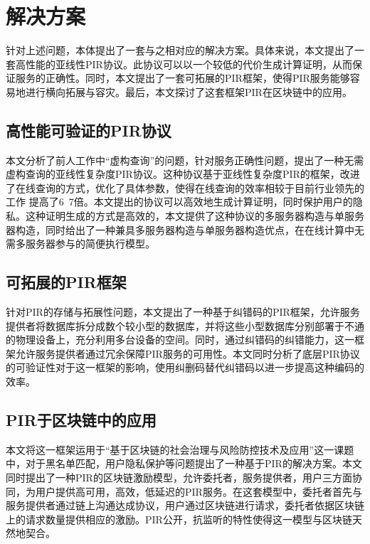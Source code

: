 \section{解决方案}
针对上述问题，本体提出了一套与之相对应的解决方案。具体来说，本文提出了一套高性能的亚线性PIR协议。此协议可以以一个较低的代价生成计算证明，从而保证服务的正确性。同时，本文提出了一套可拓展的PIR框架，使得PIR服务能够容易地进行横向拓展与容灾。最后，本文探讨了这套框架PIR在区块链中的应用。
\subsection{高性能可验证的PIR协议}
本文分析了前人工作中“虚构查询”的问题，针对服务正确性问题，提出了一种无需虚构查询的亚线性复杂度PIR协议。这种协议基于亚线性复杂度PIR的框架，改进了在线查询的方式，优化了具体参数，使得在线查询的效率相较于目前行业领先的工作 \cite{TreePIR,Piano} 提高了6~7倍。本文提出的协议可以高效地生成计算证明，同时保护用户的隐私。这种证明生成的方式是高效的，本文提供了这种协议的多服务器构造与单服务器构造，同时给出了一种兼具多服务器构造与单服务器构造优点，在在线计算中无需多服务器参与的简便执行模型。
\subsection{可拓展的PIR框架}
针对PIR的存储与拓展性问题，本文提出了一种基于纠错码的PIR框架，允许服务提供者将数据库拆分成数个较小型的数据库，并将这些小型数据库分别部署于不通的物理设备上，充分利用多台设备的空间。同时，通过纠错码的纠错能力，这一框架允许服务提供者通过冗余保障PIR服务的可用性。本文同时分析了底层PIR协议的可验证性对于这一框架的影响，使用纠删码替代纠错码以进一步提高这种编码的效率。

\subsection{PIR于区块链中的应用}
本文将这一框架运用于“基于区块链的社会治理与风险防控技术及应用”这一课题中，对于黑名单匹配，用户隐私保护等问题提出了一种基于PIR的解决方案。本文同时提出了一种PIR的区块链激励模型，允许委托者，服务提供者，用户三方面协同，为用户提供高可用，高效，低延迟的PIR服务。在这套模型中，委托者首先与服务提供者通过链上沟通达成协议，用户通过区块链进行请求，委托者依据区块链上的请求数量提供相应的激励。PIR公开，抗监听的特性使得这一模型与区块链天然地契合。